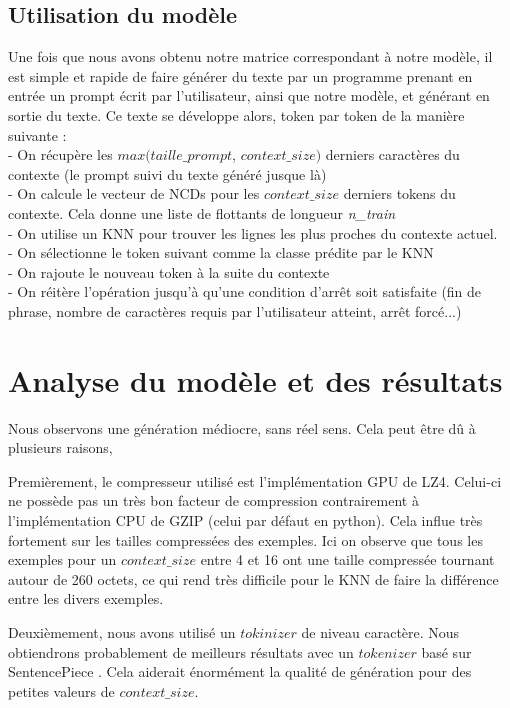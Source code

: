 \documentclass[12pt]{article}
\begin{document}
\subsection{Utilisation du modèle}
Une fois que nous avons obtenu notre matrice correspondant à notre modèle, il est simple et rapide de faire générer du texte par un programme prenant en entrée un prompt écrit par l'utilisateur, ainsi que notre modèle, et générant en sortie du texte. Ce texte se développe alors, token par token de la manière suivante :\\
- On récupère les $max(taille\_prompt$, $context\_size)$ derniers caractères du contexte (le prompt suivi du texte généré jusque là)\\
- On calcule le vecteur de NCDs pour les $context\_size$ derniers tokens du contexte. Cela donne une liste de flottants de longueur \textit{n\_train}\\
- On utilise un KNN pour trouver les lignes les plus proches du contexte actuel.\\
- On sélectionne le token suivant comme la classe prédite par le KNN\\
- On rajoute le nouveau token à la suite du contexte\\
- On réitère l'opération jusqu'à qu'une condition d'arrêt soit satisfaite (fin de phrase, nombre de caractères requis par l'utilisateur atteint, arrêt forcé...)\\

\section{Analyse du modèle et des résultats}
Nous observons une génération médiocre, sans réel sens. Cela peut être dû à plusieurs raisons, 

Premièrement, le compresseur utilisé est l'implémentation GPU de LZ4. Celui-ci ne possède pas un très bon facteur de compression contrairement à l'implémentation CPU de GZIP (celui par défaut en python). Cela influe très fortement sur les tailles compressées des exemples. Ici on observe que tous les exemples pour un $context\_size$ entre 4 et 16 ont une taille compressée tournant autour de 260 octets, ce qui rend très difficile pour le KNN de faire la différence entre les divers exemples.

Deuxièmement, nous avons utilisé un $tokinizer$ de niveau caractère. Nous obtiendrons probablement de meilleurs résultats avec un $tokenizer$ basé sur SentencePiece \cite{kudo2018sentencepiece}. Cela aiderait énormément la qualité de génération pour des petites valeurs de $context\_size$.
\end{document}

